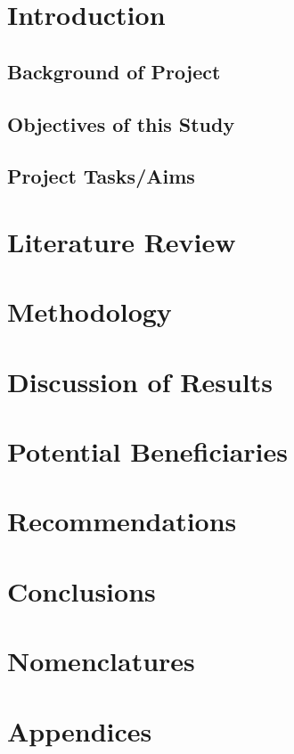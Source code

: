 \documentclass[11pt,letterpaper]{article}
\begin{document}
\newpage
\section{Introduction}
\subsection{Background of Project}
\subsection{Objectives of this Study}
\subsection{Project Tasks/Aims}

\newpage
\section{Literature Review}

\newpage
\section{Methodology}

\newpage
\section{Discussion of Results}

\newpage
\section{Potential Beneficiaries}

\newpage
\section{Recommendations}

\newpage
\section{Conclusions}

\newpage
\nocite{Nobody06}



\newpage
\section{Nomenclatures}

\newpage
\section{Appendices}


\newpage
\end{document}
